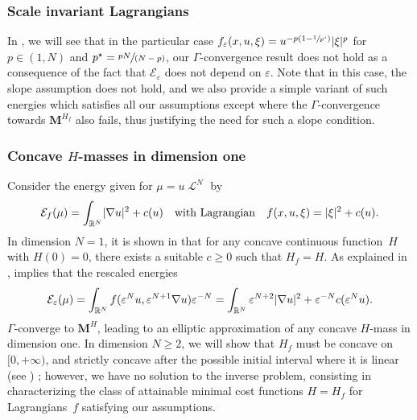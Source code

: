 \documentclass[JEP,XML,SOM,Unicode,published]{cedram}
\newcommand{\spfrac}[2]{{\sfrac{#1}{(#2)}}}
\theoremstyle{plain}
\theoremstyle{definition}
\newcommand{\R}{\mathbb{R}}
\newcommand{\ener}{\mathcal{E}}
\newcommand{\mass}{\boldsymbol{M}}
\newcommand{\eps}{\varepsilon}
\DeclarePairedDelimiter{\abs}{\lvert}{\rvert}
\DeclareMathOperator{\lbm}{\mathcal{L}}
\begin{document}
\subsubsection*{Scale invariant Lagrangians} In , we will see that in the particular case \(f_\varepsilon(x,u,\xi)=u^{-p(1-\sfrac{1}{p^\star})}\abs{\xi}^p\) for \(p\in (1,N)\) and \(p^\star=\spfrac{pN}{N-p}\), our \(\Gamma\)-convergence result does not hold as a consequence of the fact that \(\mathcal{E}_\varepsilon\) does not depend on \(\varepsilon\). Note that in this case, the slope assumption  does not hold, and we also provide a simple variant of such energies which satisfies all our assumptions except  where the $\Gamma$-convergence towards $\mass^{H_f}$ also fails, thus justifying the need for such a slope condition.

\subsubsection*{Concave \(H\)-masses in dimension one} Consider the energy given for $\mu = u\lbm^N$ by
\[\ener_f(\mu) = \int_{\R^N} \abs{\nabla u}^2 + c(u)\quad\text{with Lagrangian}\quad f(x,u,\xi) = \abs{\xi}^2 + c(u).\]
In dimension $N =1$, it is shown in \cite{wirthPhaseFieldModels2019} that for any concave continuous function~\(H\) with \(H(0)=0\), there exists a suitable $c \geq 0$ such that \(H_f=H\). As explained in ,  implies that the rescaled energies
\begin{equation}
\ener_\eps(\mu) = \int_{\R^N} f(\eps^N u,\eps^{N+1}\nabla u) \eps^{-N}= \int_{\R^N} \eps^{N+2}\abs{\nabla u}^2+\eps^{-N}c(\eps^N u).
\end{equation}
$\Gamma$-converge to $\mass^{H}$, leading to an elliptic approximation of any concave $H$-mass in dimension one. In dimension \(N\geq 2\), we will show that $H_f$ must be concave on $[0,+\infty)$, and strictly concave after the possible initial interval where it is linear (see ) ; however, we have no solution to the inverse problem, consisting in characterizing the class of attainable minimal cost functions \(H=H_f\) for Lagrangians~$f$ satisfying our assumptions.
\end{document}
